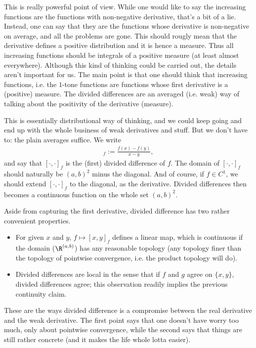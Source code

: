 This is really powerful point of view. While one would like to say the increasing functions are the functions with non-negative derivative, that's a bit of a lie. Instead, one can say that they are the functions whose derivative is non-negative on average, and all the problems are gone. This should rougly mean that the derivative defines a positive distribution and it is hence a measure. Thus all increasing functions should be integrals of a positive measure (at least almost everywhere). Although this kind of thinking could be carried out, the details aren't important for us. The main point is that one should think that increasing functions, i.e. the $1$-tone functions are functions whose first derivative is a (positive) measure. The divided differences are an averaged (i.e. weak) way of talking about the positivity of the derivative (measure).

This is essentially distributional way of thinking, and we could keep going and end up with the whole business of weak derivatives and stuff. But we don't have to: the plain averages suffice. We write
\begin{align*}
	[x, y]_{f} := \frac{f(x) - f(y)}{x - y},
\end{align*}
and say that $[\cdot, \cdot]_{f}$ is the (first) divided difference of $f$. The domain of $[\cdot, \cdot]_{f}$ should naturally be $(a, b)^{2}$ minus the diagonal. And of course, if $f \in C^{1}$, we should extend $[\cdot, \cdot]_{f}$ to the diagonal, as the derivative. Divided differences then becomes a continuous function on the whole set $(a, b)^2$.

Aside from capturing the first derivative, divided difference has two rather convenient properties.

\begin{itemize}
	\item For given $x$ and $y$, $f \mapsto [x, y]_{f}$ defines a linear map, which is continuous if the domain ($\R^{(a, b)}$) has any reasonable topology (any topology finer than the topology of pointwise convergence, i.e. the product topology will do).
	\item Divided differences are local in the sense that if $f$ and $g$ agree on $\{x, y\}$, divided differences agree; this observation readily implies the previous continuity claim.
\end{itemize}

These are the ways divided difference is a compromise between the real derivative and the weak derivative. The first point says that one doesn't have worry too much, only about pointwise convergence, while the second says that things are still rather concrete (and it makes the life whole lotta easier).

